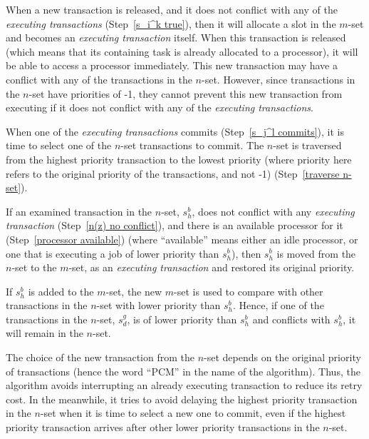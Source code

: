 When a new transaction is released, and it does not conflict with
any of the \emph{executing transactions} (Step~\ref{s_i^k true}), then
it will allocate a slot in the $m$-set and becomes an
\emph{executing transaction} itself. When this transaction is released (which means that its containing task is already allocated to a processor), it will be able to access a processor immediately. 
This new transaction may have a conflict with any of the transactions in the $n$-set. However, since transactions in the $n$-set have priorities of -1, they cannot prevent this new transaction from executing if it does not conflict with any of the \emph{executing transactions}.

When one of the \emph{executing transactions} commits (Step~\ref{s_j^l commits}), it is time to select one of the $n$-set transactions to
commit. The $n$-set is traversed from the highest priority
transaction to the lowest priority (where priority here refers to the
original priority of the transactions, and not -1) (Step~\ref{traverse n-set}).

If an examined transaction in the $n$-set, $s_{h}^{b}$,
does not conflict with any \emph{executing transaction} (Step~\ref{n(z) no conflict}),
and there is an available processor for it (Step~\ref{processor available})
(where ``available'' means either an idle processor, or one that
is executing a job of lower priority than $s_{h}^{b}$),
then $s_{h}^{b}$ is moved from the $n$-set to the
$m$-set, as an \emph{executing transaction} and restored its original priority. 

If $s_{h}^{b}$ is added to the $m$-set, the new $m$-set is used to compare with other transactions in the $n$-set with lower priority than $s_{h}^{b}$. 
Hence, if one of the transactions in the $n$-set, $s_{d}^{g}$, is of
lower priority than $s_{h}^{b}$ and conflicts with $s_{h}^{b}$,
it will remain in the $n$-set. 

The choice of the new transaction
from the $n$-set depends on the original priority of transactions (hence the word  ``PCM'' in the name of the algorithm). Thus, the algorithm
avoids interrupting an already executing transaction to reduce its
retry cost. In the meanwhile, it tries to avoid delaying the highest priority
transaction in the $n$-set when it is time to select a new
one to commit, even if the highest priority transaction arrives after
other lower priority transactions in the $n$-set.


